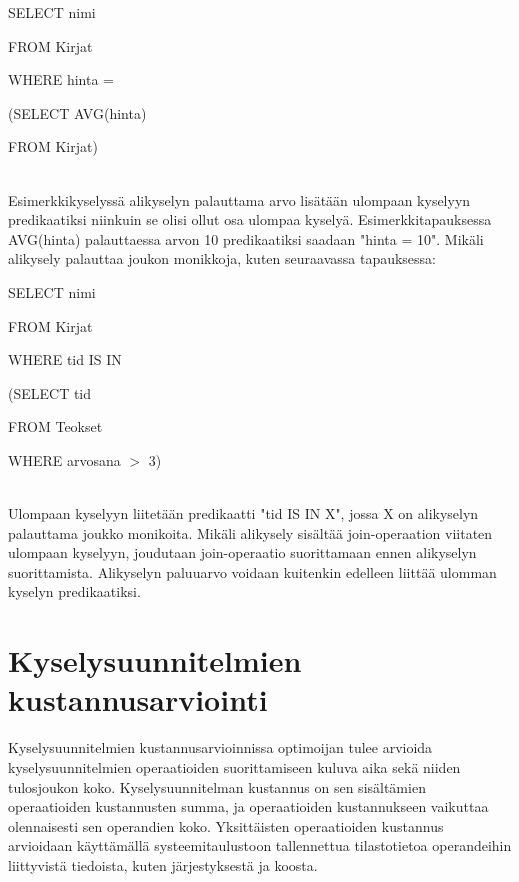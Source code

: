 \documentclass[finnish]{tktltiki2}
\theoremstyle{definition}
\theoremstyle{remark}
\begin{document}
\begin{frame}

SELECT nimi

FROM Kirjat

WHERE hinta = 

\hspace*{5mm}(SELECT AVG(hinta)
		
\hspace*{5mm}FROM Kirjat)
\end{frame}
\\\newline
Esimerkkikyselyssä alikyselyn palauttama arvo lisätään ulompaan kyselyyn predikaatiksi niinkuin se olisi ollut osa ulompaa kyselyä. Esimerkkitapauksessa AVG(hinta) palauttaessa arvon 10 predikaatiksi saadaan "hinta = 10". Mikäli alikysely palauttaa joukon monikkoja, kuten seuraavassa tapauksessa:
\newline

\begin{frame}

SELECT nimi

FROM Kirjat

WHERE tid IS IN 

\hspace*{5mm}(SELECT tid
		
\hspace*{5mm}FROM Teokset

\hspace*{5mm}WHERE arvosana $>$ 3)
\end{frame}
\\\newline
Ulompaan kyselyyn liitetään predikaatti "tid IS IN X", jossa X on alikyselyn palauttama joukko monikoita. Mikäli alikysely sisältää join-operaation viitaten ulompaan kyselyyn, joudutaan join-operaatio suorittamaan ennen alikyselyn suorittamista. Alikyselyn paluuarvo voidaan kuitenkin edelleen liittää ulomman kyselyn predikaatiksi.


\section{Kyselysuunnitelmien kustannusarviointi}
Kyselysuunnitelmien kustannusarvioinnissa optimoijan tulee arvioida kyselysuunnitelmien operaatioiden suorittamiseen kuluva aika sekä niiden tulosjoukon koko. Kyselysuunnitelman kustannus on sen sisältämien operaatioiden kustannusten summa, ja operaatioiden kustannukseen vaikuttaa olennaisesti sen operandien koko. Yksittäisten operaatioiden kustannus arvioidaan käyttämällä systeemitaulustoon tallennettua tilastotietoa operandeihin liittyvistä tiedoista, kuten järjestyksestä ja koosta. 
\end{document}
